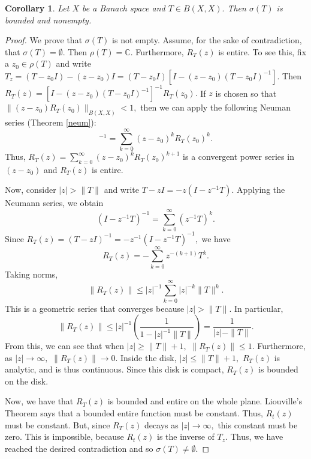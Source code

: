 \documentclass[12pt,a4paper]{article}
\theoremstyle{boldthm}
\newtheorem{corollary}[theorem]{Corollary}
\theoremstyle{bolddefn}
\begin{document}
\begin{corollary}
    Let $X$ be a Banach space and $T \in B(X, X).$ Then $\sigma(T)$ is bounded and nonempty. 
\end{corollary}
\begin{proof}
We prove that $\sigma(T)$ is not empty.
Assume, for the sake of contradiction, that $\sigma(T) = \emptyset.$ Then $\rho(T) = \mathbb{C}.$ Furthermore, $R_T(z)$ is entire. To see this, fix a $z_0 \in \rho(T)$ and write $T_z = (T-z_0 I) - (z-z_0)I = (T-z_0I) [ I - (z-z_0)(T-z_0I)^{-1}].$ Then $R_T(z) = [ I - (z-z_0)(T-z_0I)^{-1}]^{-1} R_T(z_0).$ If $z$ is chosen so that $\| (z-z_0) R_T(z_0) \|_{B(X, X)} < 1,$ then we can apply the following Neuman series (Theorem \ref{neum}):
\begin{equation}
    [ I - (z-z_0)(T-z_0I)^{-1}]^{-1} = \sum_{k=0}^{\infty} (z-z_0)^k R_T(z_0)^k.
\end{equation}
Thus, $R_T(z) = \sum_{k=0}^{\infty} (z-z_0)^k R_T(z_0)^{k+1}$ is a convergent power series in $(z-z_0)$ and $R_T(z)$ is entire. 


Now, consider $|z| > \| T \|$ and write $T-zI = -z (I - z^{-1} T).$ Applying the Neumann series, we obtain
\begin{equation}
    (I - z^{-1} T)^{-1} = \sum_{k=0}^{\infty} (z^{-1} T)^k.
\end{equation}
Since $R_T(z) = (T-zI)^{-1} = -z^{-1}(I - z^{-1} T)^{-1},$ we have
\begin{equation}
    R_T(z) = - \sum_{k=0}^{\infty} z^{-(k+1)} T^k.
\end{equation}
Taking norms, 
\begin{equation}
    \| R_T(z) \| \le |z|^{-1} \sum_{k=0}^{\infty} |z|^{-k} \|T\|^k.
\end{equation}
This is a geometric series that converges because $|z|>\|T\|.$ In particular,
\begin{equation}
    \| R_T(z) \| \le |z|^{-1} \left(\frac{1}{1 - |z|^{-1} \|T\|}\right) = \frac{1}{|z| - \|T\|}.
\end{equation}
From this, we can see that when $|z| \ge \|T\| + 1,$ $\|R_T(z)\| \le 1.$ Furthermore, as $|z| \rightarrow \infty,$ $\|R_T(z)\| \rightarrow 0.$ Inside the disk, $|z| \le \|T\| + 1,$ $R_T(z)$ is analytic, and is thus continuous. Since this disk is compact, $R_T(z)$ is bounded on the disk. 

Now, we have that $R_T(z)$ is bounded and entire on the whole plane. Liouville's Theorem says that a bounded entire function must be constant. Thus, $R_t(z)$ must be constant. But, since $R_T(z)$ decays as $|z| \rightarrow \infty,$ this constant must be zero. This is impossible, because $R_t(z)$ is the inverse of $T_z.$ Thus, we have reached the desired contradiction and so $\sigma(T) \ne \emptyset.$



\end{proof}
\end{document}
